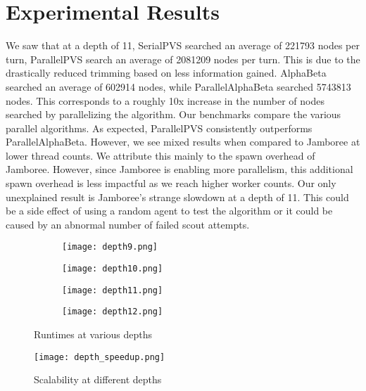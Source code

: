 \documentclass[]{article}
\begin{document}
\section*{Experimental Results}
We saw that at a depth of 11, SerialPVS searched an average of 221793 nodes per turn, ParallelPVS search an average of 2081209 nodes per turn.  This is due to the drastically reduced trimming based on less information gained.  AlphaBeta searched an average of 602914 nodes, while ParallelAlphaBeta searched 5743813 nodes.  This corresponds to a roughly 10x increase in the number of nodes searched by parallelizing the algorithm.  Our benchmarks compare the various parallel algorithms.  As expected, ParallelPVS consistently outperforms ParallelAlphaBeta.  However, we see mixed results when compared to Jamboree at lower thread counts.  We attribute this mainly to the spawn overhead of Jamboree.  However, since Jamboree is enabling more parallelism, this additional spawn overhead is less impactful as we reach higher worker counts.  Our only unexplained result is Jamboree's strange slowdown at a depth of 11.  This could be a side effect of using a random agent to test the algorithm or it could be caused by an abnormal number of failed scout attempts.
\begin{figure}[h]
\begin{subfigure}[b]{0.5\textwidth}
\texttt{[image: depth9.png]}
\end{subfigure}
\begin{subfigure}[b]{0.5\textwidth}
\texttt{[image: depth10.png]}
\end{subfigure}
\begin{subfigure}[b]{0.5\textwidth}
\texttt{[image: depth11.png]}
\end{subfigure}
\begin{subfigure}[b]{0.5\textwidth}
\texttt{[image: depth12.png]}
\end{subfigure}
\caption{Runtimes at various depths}
\end{figure}
\begin{figure}[t]
\texttt{[image: depth\_speedup.png]}
\centering
\caption{Scalability at different depths}
\end{figure}
\end{document}
